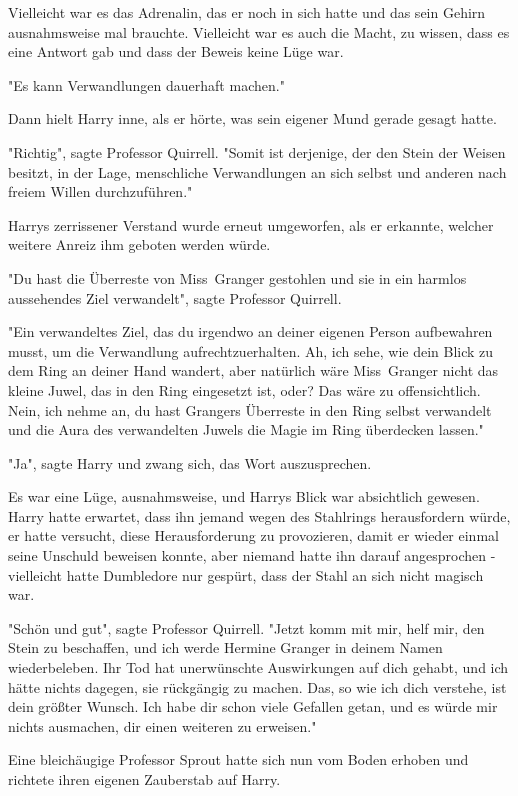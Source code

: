 {Vielleicht war es das Adrenalin, das er noch in sich hatte und das sein Gehirn ausnahmsweise mal brauchte. Vielleicht war es auch die Macht, zu wissen, dass es eine Antwort gab und dass der Beweis keine Lüge war.

"Es kann Verwandlungen dauerhaft machen."

Dann hielt Harry inne, als er hörte, was sein eigener Mund gerade gesagt hatte.

"Richtig", sagte Professor Quirrell. "Somit ist derjenige, der den Stein der Weisen besitzt, in der Lage, menschliche Verwandlungen an sich selbst und anderen nach freiem Willen durchzuführen."

Harrys zerrissener Verstand wurde erneut umgeworfen, als er erkannte, welcher weitere Anreiz ihm geboten werden würde.

"Du hast die Überreste von Miss~Granger gestohlen und sie in ein harmlos aussehendes Ziel verwandelt", sagte Professor Quirrell.

"Ein verwandeltes Ziel, das du irgendwo an deiner eigenen Person aufbewahren musst, um die Verwandlung aufrechtzuerhalten. Ah, ich sehe, wie dein Blick zu dem Ring an deiner Hand wandert, aber natürlich wäre Miss~Granger nicht das kleine Juwel, das in den Ring eingesetzt ist, oder? Das wäre zu offensichtlich. Nein, ich nehme an, du hast Grangers Überreste in den Ring selbst verwandelt und die Aura des verwandelten Juwels die Magie im Ring überdecken lassen."

"Ja", sagte Harry und zwang sich, das Wort auszusprechen.

Es war eine Lüge, ausnahmsweise, und Harrys Blick war absichtlich gewesen. Harry hatte erwartet, dass ihn jemand wegen des Stahlrings herausfordern würde, er hatte versucht, diese Herausforderung zu provozieren, damit er wieder einmal seine Unschuld beweisen konnte, aber niemand hatte ihn darauf angesprochen - vielleicht hatte Dumbledore nur gespürt, dass der Stahl an sich nicht magisch war.

"Schön und gut", sagte Professor Quirrell. "Jetzt komm mit mir, helf mir, den Stein zu beschaffen, und ich werde Hermine Granger in deinem Namen wiederbeleben. Ihr Tod hat unerwünschte Auswirkungen auf dich gehabt, und ich hätte nichts dagegen, sie rückgängig zu machen. Das, so wie ich dich verstehe, ist dein größter Wunsch. Ich habe dir schon viele Gefallen getan, und es würde mir nichts ausmachen, dir einen weiteren zu erweisen."

Eine bleichäugige Professor Sprout hatte sich nun vom Boden erhoben und richtete ihren eigenen Zauberstab auf Harry.

}
